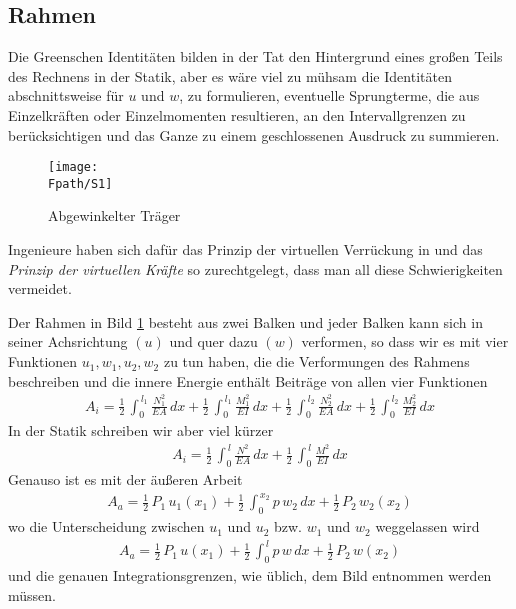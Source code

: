 \subsection{Rahmen}

Die Greenschen Identit\"{a}ten bilden in der Tat den Hintergrund eines gro{\ss}en Teils des Rechnens in der Statik, aber es w\"{a}re viel zu m\"{u}hsam die Identit\"{a}ten abschnittsweise f\"{u}r  $u$ und $w$, zu formulieren, eventuelle Sprungterme, die aus Einzelkr\"{a}ften oder Einzelmomenten resultieren, an den Intervallgrenzen zu ber\"{u}cksichtigen und das Ganze zu einem geschlossenen Ausdruck zu summieren.
\begin{figure}[tbp]
\centering
\if {} \sidecaption \fi
\centering
\texttt{[image: \\Fpath/S1]}
\caption{Abgewinkelter Tr\"{a}ger} \label{S1}
\end{figure}%

Ingenieure haben sich daf\"{u}r das Prinzip der virtuellen Verr\"{u}ckung in und das {\em Prinzip der virtuellen Kr\"{a}fte\/} so zurechtgelegt, dass man all diese Schwierigkeiten vermeidet.

Der Rahmen in Bild \ref{S1} besteht aus zwei Balken und jeder Balken kann sich in seiner Achsrichtung $(u)$ und quer dazu $(w)$ verformen, so dass wir es mit vier Funktionen $u_1, w_1, u_2, w_2$ zu tun haben, die die Verformungen des Rahmens beschreiben und die innere Energie enth\"{a}lt Beitr\"{a}ge von allen vier Funktionen
\begin{align}
A_i = \frac{1}{2}\,\int_0^{\,l_1} \frac{N_1^2}{EA}\,dx + \frac{1}{2}\,\int_0^{\,l_1} \frac{M_1^2}{EI}\,dx + \frac{1}{2}\,\int_0^{\,l_2} \frac{N_2^2}{EA}\,dx + \frac{1}{2}\,\int_0^{\,l_2} \frac{M_2^2}{EI}\,dx
\end{align}
In der Statik schreiben wir aber viel k\"{u}rzer
\begin{align}
A_i = \frac{1}{2}\,\int_0^{\,l} \frac{N^2}{EA}\,dx + \frac{1}{2}\,\int_0^{\,l} \frac{M^2}{EI}\,dx
\end{align}
Genauso ist es mit der \"{a}u{\ss}eren Arbeit
\begin{align}
A_a  = \frac{1}{2}\,P_1\,u_1(x_1) + \frac{1}{2}\,\int_0^{\,x_2} p\,w_2\,dx + \frac{1}{2}\,P_2\,w_2(x_2)
\end{align}
wo die Unterscheidung zwischen $u_1$ und $u_2$ bzw. $w_1$ und $w_2$ weggelassen wird
\begin{align}
A_a = \frac{1}{2}\,P_1\,u(x_1) + \frac{1}{2}\,\int_0^{\,l} p\,w\,dx + \frac{1}{2}\,P_2\,w(x_2)
\end{align}
und die genauen Integrationsgrenzen, wie \"{u}blich, dem Bild entnommen werden m\"{u}ssen.
\\

